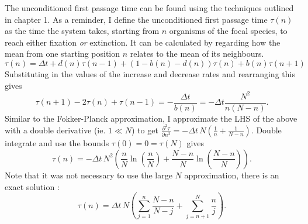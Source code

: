 The unconditioned first passage time can be found using the techniques outlined in chapter 1. 
As a reminder, I define the unconditioned first passage time $\tau(n)$ as the time the system takes, starting from $n$ organisms of the focal species, to reach either fixation \emph{or} extinction. 
It can be calculated by regarding how the mean from one starting position $n$ relates to the mean of its neighbours.
\begin{equation}
\tau(n) = \Delta t + d(n)\tau(n-1) + \left(1-b(n)-d(n)\right)\tau(n) + b(n)\tau(n+1)
\end{equation}
Substituting in the values of the increase and decrease rates and rearranging this gives
\begin{equation*}
\tau(n+1) - 2\tau(n) + \tau(n-1) = -\frac{\Delta t}{b(n)} = -\Delta t\frac{N^2}{n(N-n)}. %
\end{equation*}
Similar to the Fokker-Planck approximation, I approximate the LHS of the above with a double derivative (ie. $1\ll N$) to get $\frac{\partial^2\tau}{\partial n^2} = -\Delta t\,N\left(\frac{1}{n}+\frac{1}{N-n}\right)$. 
Double integrate and use the bounds $\tau(0) = 0 = \tau(N)$ gives
\begin{equation}
\tau(n) = -\Delta t\,N^2\left(\frac{n}{N}\ln\left(\frac{n}{N}\right)+\frac{N-n}{N}\ln\left(\frac{N-n}{N}\right)\right).
\end{equation}
Note that it was not necessary to use the large $N$ approximation, there is an exact solution \cite{???}:
\begin{equation}
\tau(n) = \Delta t\,N\left(\sum_{j=1}^n\frac{N-n}{N-j} + \sum_{j=n+1}^N\frac{n}{j}\right).
\end{equation}


